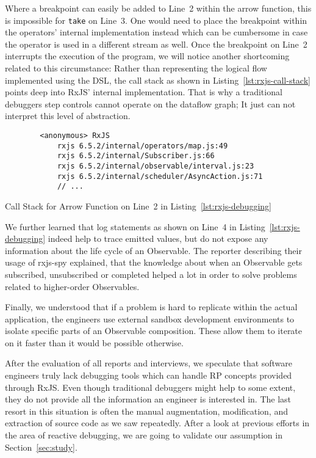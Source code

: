 \documentclass[12pt,a4paper]{article}
\begin{document}
Where a breakpoint can easily be added to Line~2 within the arrow function, this is impossible for \texttt{take} on Line~3. One would need to place the breakpoint within the operators' internal implementation instead which can be cumbersome in case the operator is used in a different stream as well. Once the breakpoint on Line~2 interrupts the execution of the program, we will notice another shortcoming related to this circumstance: Rather than representing the logical flow implemented using the DSL, the call stack as shown in Listing~\ref{lst:rxjs-call-stack} points deep into RxJS' internal implementation. That is why a traditional debuggers step controls cannot operate on the dataflow graph; It just can not interpret this level of abstraction.

\begin{listing}[H]
	\begin{verbatim}
		<anonymous> RxJS
			rxjs 6.5.2/internal/operators/map.js:49
			rxjs 6.5.2/internal/Subscriber.js:66
			rxjs 6.5.2/internal/observable/interval.js:23
			rxjs 6.5.2/internal/scheduler/AsyncAction.js:71
			// ...
	\end{verbatim}
	\caption{Call Stack for Arrow Function on Line~2 in Listing~\ref{lst:rxjs-debugging}}
	\label{lst:rxjs-call-stack}
\end{listing}

We further learned that log statements as shown on Line~4 in Listing~\ref{lst:rxjs-debugging} indeed help to trace emitted values, but do not expose any information about the life cycle of an Observable. The reporter describing their usage of rxjs-spy explained, that the knowledge about when an Observable gets subscribed, unsubscribed or completed helped a lot in order to solve problems related to higher-order Observables.

Finally, we understood that if a problem is hard to replicate within the actual application, the engineers use external sandbox development environments to isolate specific parts of an Observable composition. These allow them to iterate on it faster than it would be possible otherwise.

After the evaluation of all reports and interviews, we speculate that software engineers truly lack debugging tools which can handle RP concepts provided through RxJS. Even though traditional debuggers might help to some extent, they do not provide all the information an engineer is interested in. The last resort in this situation is often the manual augmentation, modification, and extraction of source code as we saw repeatedly. After a look at previous efforts in the area of reactive debugging, we are going to validate our assumption in Section~\ref{sec:study}.
\end{document}
